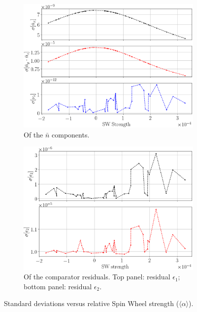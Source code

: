 \documentclass[a4paper]{jacow}
\newcommand{\avg}[1]{\langle {#1} \rangle}
\newcommand{\nbar}{\bar n}
\begin{document}
\begin{figure}[h]
  \centering
  \begin{subfigure}{\linewidth}
    \centering
    \includegraphics[width=\linewidth]{../img/IPAC19/NBAR_variation_sd_vs_SW}
    \caption{Of the $\nbar$ components.\label{fig:sd:nbar}}
  \end{subfigure}
  \begin{subfigure}{\linewidth}
    \centering
    \includegraphics[width=\linewidth]{../img/IPAC19/residual_SD_vs_SW(both)}
    \caption{Of the comparator residuals.
      Top panel: residual $\epsilon_1$; bottom panel: residual $\epsilon_2$.\label{fig:sd:res}}
  \end{subfigure}
  \caption{Standard deviations versus relative Spin Wheel strength ($\avg{\alpha}$).\label{fig:sd}}
\end{figure}
\end{document}
